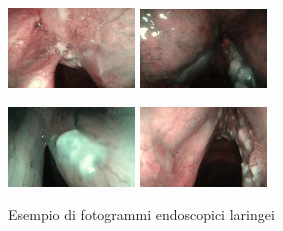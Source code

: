 \begin{figure}[ht]
    \centering
    \includegraphics[width=0.3\textwidth]{introduzione/Larynge-1.jpg}
    \includegraphics[width=0.3\textwidth]{introduzione/Larynge-2.jpg}

    \includegraphics[width=0.3\textwidth]
    {introduzione/Larynge-3.jpg}
    \includegraphics[width=0.3\textwidth]{introduzione/Larynge-4.jpg}
    \caption{Esempio di fotogrammi endoscopici laringei}
    \label{fig:larynges}
\end{figure}


